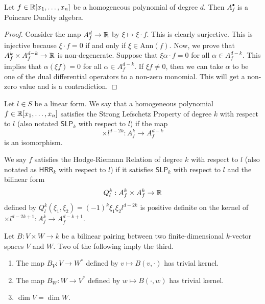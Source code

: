 \documentclass[12pt]{article}
\begin{document}
\begin{prop}
	Let $f \in \mathbb{R}[x_1, \ldots, x_n]$ be a homogeneous polynomial of degree $d$. Then $A_f^\bullet$ is a Poincare Duality algebra.
\end{prop}

\begin{proof}
	Consider the map $A_f^d \to \mathbb{R}$ by $\xi \mapsto \xi \cdot f$. This is clearly surjective. This is injective because $\xi \cdot f = 0$ if and only if $\xi \in \text{Ann}(f)$. Now, we prove that $A_f^k \times A_f^{d-k} \to \mathbb{R}$ is non-degenerate. Suppose that $\xi \alpha \cdot f = 0$ for all $\alpha \in A_f^{d-k}$. This implies that $\alpha (\xi f) = 0$ for all $\alpha \in A_f^{d-k}$. If $\xi f \neq 0$, then we can take $\alpha$ to be one of the dual differential operators to a non-zero monomial. This will get a non-zero value and is a contradiction. 
\end{proof}

\begin{defn} 
	Let $l \in S$ be a linear form. We say that a homogeneous polynomial $f \in \mathbb{R}[x_1, \ldots, x_n]$ satisfies the Strong Lefschetz Property of degree $k$ with respect to $l$ (also notated $\mathsf{SLP}_k$ with respect to $l$) if the map 
	\[
		\times l^{d-2k} : A_f^k \to A_f^{d-k}
	\]
	is an isomorphism. 
\end{defn}

\begin{defn} 
	We say $f$ satisfies the Hodge-Riemann Relation of degree $k$ with respect to $l$ (also notated as $\mathsf{HRR}_k$ with respect to $l$) if it satisfies $\mathsf{SLP}_k$ with respect to $l$ and the bilinear form 
	\[
		Q^k_l : A_f^k \times A_f^k \to \mathbb{R}
	\] 
	defined by $Q^k_l(\xi_1, \xi_2) = (-1)^k \xi_1 \xi_2 l^{d-2k}$ is positive definite on the kernel of $\times l^{d-2k+1} : A_f^k \to A_f^{d-k+1}$.
\end{defn}

\begin{prop} \label{non-degeneracy}
	Let $B : V \times W \to k$ be a bilinear pairing between two finite-dimensional $k$-vector spaces $V$ and $W$. Two of the following imply the third.
	\begin{enumerate}[label = (\roman*)]
		\item The map $B_V : V \to W^*$ defined by $v \mapsto B(v, \cdot)$ has trivial kernel. 

		\item The map $B_W : W \to V^*$ defined by $w \mapsto B(\cdot, w)$ has trivial kernel. 

		\item $\dim V = \dim W$.
	\end{enumerate} 
\end{prop}
\end{document}
